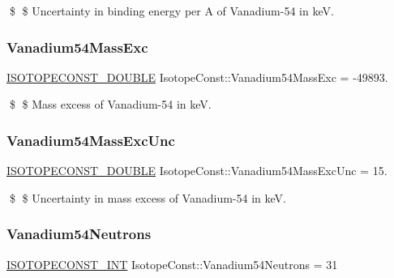 \$ \$ Uncertainty in binding energy per A of Vanadium-\/54 in keV. \mbox{\label{group___isotope_const-_vanadium-_v54_ga50002f35027e7ab0e44b20a0419a96f8}} 
\subsubsection{\texorpdfstring{Vanadium54\+Mass\+Exc}{Vanadium54MassExc}}
{\footnotesize\ttfamily \mbox{\hyperlink{group___isotope_const-_macros_ga8f45a7272ce02c0b4c65c44636ed719a}{I\+S\+O\+T\+O\+P\+E\+C\+O\+N\+S\+T\+\_\+\+D\+O\+U\+B\+LE}} Isotope\+Const\+::\+Vanadium54\+Mass\+Exc = -\/49893.}

\$ \$ Mass excess of Vanadium-\/54 in keV. \mbox{\label{group___isotope_const-_vanadium-_v54_gaf52558c54bfece737058f0924f003543}} 
\subsubsection{\texorpdfstring{Vanadium54\+Mass\+Exc\+Unc}{Vanadium54MassExcUnc}}
{\footnotesize\ttfamily \mbox{\hyperlink{group___isotope_const-_macros_ga8f45a7272ce02c0b4c65c44636ed719a}{I\+S\+O\+T\+O\+P\+E\+C\+O\+N\+S\+T\+\_\+\+D\+O\+U\+B\+LE}} Isotope\+Const\+::\+Vanadium54\+Mass\+Exc\+Unc = 15.}

\$ \$ Uncertainty in mass excess of Vanadium-\/54 in keV. \mbox{\label{group___isotope_const-_vanadium-_v54_ga43627b6e01b540e247bccadeb2d44781}} 
\subsubsection{\texorpdfstring{Vanadium54\+Neutrons}{Vanadium54Neutrons}}
{\footnotesize\ttfamily \mbox{\hyperlink{group___isotope_const-_macros_ga5f18360b3e99483a35c32d789e62621c}{I\+S\+O\+T\+O\+P\+E\+C\+O\+N\+S\+T\+\_\+\+I\+NT}} Isotope\+Const\+::\+Vanadium54\+Neutrons = 31}

